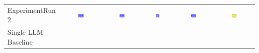 \begin{table}
\begin{tabular}{@{}lccccc@{}}
    ExperimentRun 2 & \includegraphics[width=0.15\textwidth]{./run_2/png/gpt-4o_results/MicrofluidicChip.png} & \includegraphics[width=0.15\textwidth]{./run_2/png/o1-preview_results/MicrofluidicChip.png} & \includegraphics[width=0.15\textwidth]{./run_2/png/claude-3-5-sonnet-20240620_results/MicrofluidicChip.png} & \includegraphics[width=0.15\textwidth]{./run_2/png/watsonx_meta-llama_llama-3-1-70b-instruct_results/MicrofluidicChip.png} & \includegraphics[width=0.15\textwidth]{./run_2/png/watsonx_meta-llama_llama-3-405b-instruct_results/MicrofluidicChip.png} \\
    Single LLM Baseline \\

\end{tabular}
\end{table}
